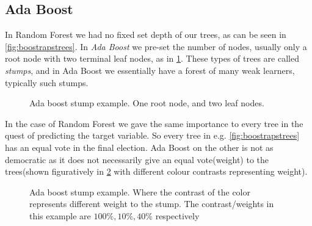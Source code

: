 \subsection{Ada Boost}
In Random Forest we had no fixed set depth of our trees, as can be seen in \cref{fig:boostrapstrees}. In \textit{Ada Boost} we pre-set the number of nodes, usually only a root node with two terminal leaf nodes, as in \cref{fig:AdaBoost1}.
These types of trees are called \textit{stumps}, and in Ada Boost we essentially have a forest of many weak learners, typically such stumps.


\begin{figure}[htb]
\begin{center}
\caption{Ada boost stump example. One root node, and two leaf nodes.}\label{fig:AdaBoost1}
\end{center}
\end{figure}

In the case of Random Forest we gave the same importance to every tree in the quest of predicting the target variable. So every tree in e.g. \ref{fig:boostrapstrees} has an equal vote in the final election.
Ada Boost on the other is not as democratic as it does not necessarily give an equal vote(weight) to the trees(shown figuratively in \cref{fig:AdaBoost2} with different colour contrasts representing weight).

\begin{figure}[htb]
\begin{center}
\qquad
{}\qquad
{}\qquad
\caption{Ada boost stump example. Where the contrast of the color represents different weight to the stump. The contrast/weights in this example are $100\%, 10\%, 40\%$ respectively }\label{fig:AdaBoost2}
\end{center}
\end{figure}

